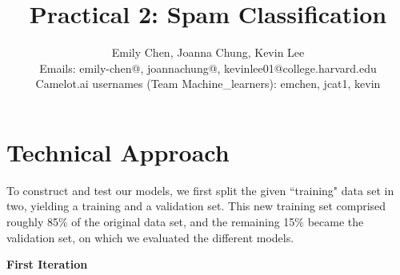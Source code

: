 \documentclass[11pt]{article}
\title{Practical 2: Spam Classification}
\author{Emily Chen, Joanna Chung, Kevin Lee \\
Emails: emily-chen@, joannachung@, kevinlee01@college.harvard.edu \\
Camelot.ai usernames (Team Machine\_learners): emchen, jcat1, kevin}
\begin{document}
\maketitle{}

\section{Technical Approach}

To construct and test our models, we first split the given ``training" data set in two, yielding a training and a validation set. This new training set comprised roughly 85\% of the original data set, and the remaining 15\% became the validation set, on which we evaluated the different models.

\begin{center}
      \textbf{First Iteration}
  \end{center}
  
\end{document}
